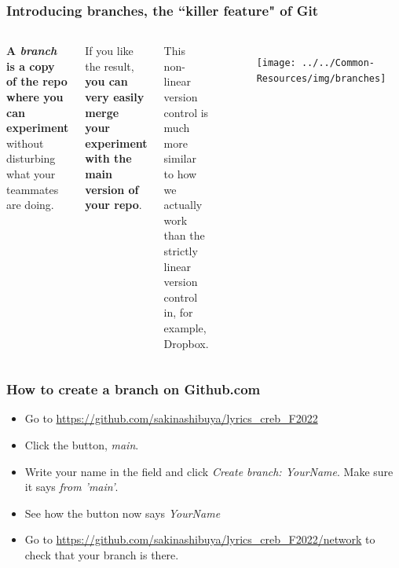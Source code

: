 \documentclass[aspectratio=169]{beamer} %
\newcommand{\trainingURL}[1]{{\color{blue}\url{#1}}}
\newcommand{\traininerUsername}{sakinashibuya}
\newcommand{\repoName}{\traininerUsername/lyrics_creb_F2022}
\newcommand{\trainingRepoURL}[1]{\trainingURL{https://github.com/\repoName #1}}
\begin{document}
\begin{frame}
\frametitle{Introducing branches, the ``killer feature" of Git}

	\begin{columns}[c]

	
		\textbf{A \textit{branch} is a copy of the repo where you can experiment} without disturbing what your teammates are doing. 
		
		\vspace{.5cm}
		
		If you like the result, \textbf{you can very easily merge your experiment with the main version of your repo}.

		\vspace{.5cm}

		This non-linear version control is much more similar to how we actually work than the strictly linear version control in, for example, Dropbox.

		\begin{figure}
			\centering
			\texttt{[image: ../../Common-Resources/img/branches]}
			\label{fig:branches}
		\end{figure}

	\end{columns}

\end{frame}


\begin{frame}
\frametitle{How to create a branch on Github.com}

	\begin{itemize}
		\setlength\itemsep{3mm}
		\item Go to \trainingRepoURL{}
		\item Click the button, \textit{main}.
		\item Write your name in the field and click \textit{Create branch: YourName}. Make sure it says \textit{from 'main'}.
		\item See how the button now says \textit{YourName}
		\item Go to \trainingRepoURL{/network} to check that your branch is there.
	\end{itemize}

\end{frame}
\end{document}

